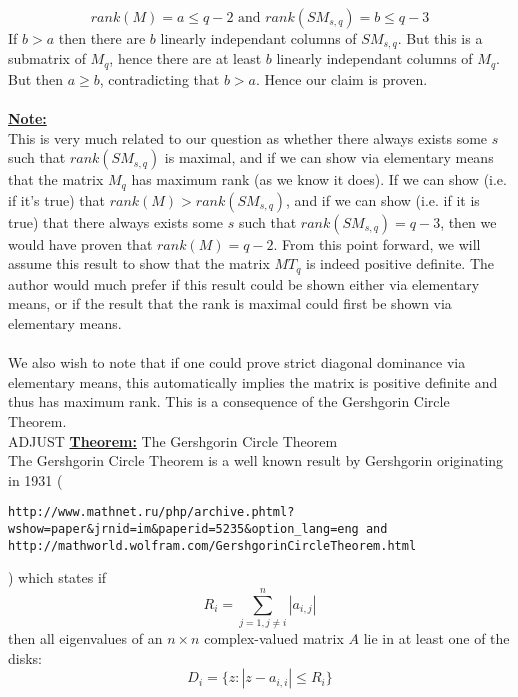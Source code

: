 \documentclass[11pt]{article}
\theoremstyle{plain}
\theoremstyle{definition}
\begin{document}
\begin{equation*}
rank(M) = a \leq q-2 \text{ and } rank(SM_{s,q})=b \leq q-3
\end{equation*}
If $b>a$ then there are $b$ linearly independant columns of $SM_{s,q}$. But this is a submatrix of $M_q$, hence there are at least $b$ linearly independant columns of $M_q$. But then $a\geq b$, contradicting that $b>a$. Hence our claim is proven.\\
\\
\textbf{\underline{Note: }}\\ This is very much related to our question as whether there always exists some $s$ such that $rank(SM_{s,q})$ is maximal, and if we can show via elementary means that the matrix $M_q$ has maximum rank (as we know it does). If we can show (i.e. if it's true) that $rank(M) > rank(SM_{s,q})$, and if we can show (i.e. if it is true) that there always exists some $s$ such that $rank(SM_{s,q}) = q-3$, then we would have proven that $rank(M) = q-2$. From this point forward, we will assume this result to show that the matrix $MT_q$ is indeed positive definite. The author would much prefer if this result could be shown either via elementary means, or if the result that the rank is maximal could first be shown via elementary means.\\
\\
We also wish to note that if one could prove strict diagonal dominance via elementary means, this automatically implies the matrix is positive definite and thus has maximum rank. This is a consequence of the Gershgorin Circle Theorem.
\\
ADJUST
\textbf{\underline{Theorem:}} The Gershgorin Circle Theorem\\
The Gershgorin Circle Theorem is a well known result by Gershgorin originating in 1931 (
\begin{verbatim}
http://www.mathnet.ru/php/archive.phtml?wshow=paper&jrnid=im&paperid=5235&option_lang=eng and http://mathworld.wolfram.com/GershgorinCircleTheorem.html
\end{verbatim}	
) which states if 
\begin{equation*}
R_i = \sum\limits_{j=1, j \neq i}^n |a_{i,j}|
\end{equation*}
then all eigenvalues of an $n \times n$ complex-valued matrix $A$ lie in at least one of the disks:
\begin{equation*}
D_i = \{ z: |z-a_{i,i}| \leq R_i\}
\end{equation*}
\end{document}
